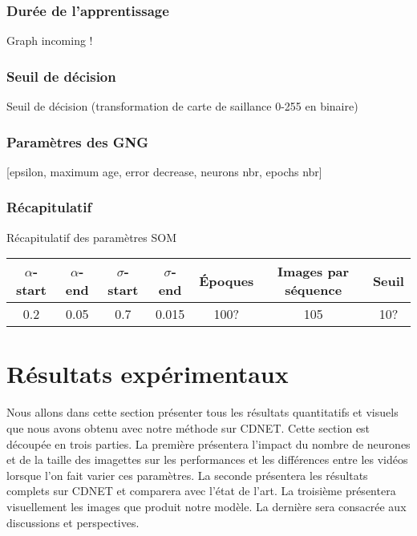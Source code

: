 	\subsubsection{Durée de l'apprentissage}

	Graph incoming !

	\subsubsection{Seuil de décision}

	Seuil de décision (transformation de carte de saillance 0-255 en binaire)

	\subsubsection{Paramètres des GNG}

	[epsilon, maximum age, error decrease, neurons nbr, epochs nbr]

	\subsubsection{Récapitulatif}

	\begin{tableth}
	\label{tab:recap:param}
	\caption[Récapitulatif des paramètres SOM]{Récapitulatif des paramètres SOM}
	\begin{tabular}{|cc|cc|c|c|c|}
		\hline
		$\alpha$-start	& $\alpha$-end & $\sigma$-start & $\sigma$-end & Époques & Images par séquence & Seuil\\
		\hline
		0.2 & 0.05 & 0.7 & 0.015 & 100? & 105 & 10?\\
		\hline
	\end{tabular}
	\end{tableth}


	\newpage

	\section{Résultats expérimentaux}

	Nous allons dans cette section présenter tous les résultats quantitatifs et visuels que nous avons obtenu avec notre méthode sur CDNET. Cette section est découpée en trois parties. La première présentera l'impact du nombre de neurones et de la taille des imagettes sur les performances et les différences entre les vidéos lorsque l'on fait varier ces paramètres. La seconde présentera les résultats complets sur CDNET et comparera avec l'état de l'art. La troisième présentera visuellement les images que produit notre modèle. La dernière sera consacrée aux discussions et perspectives.

